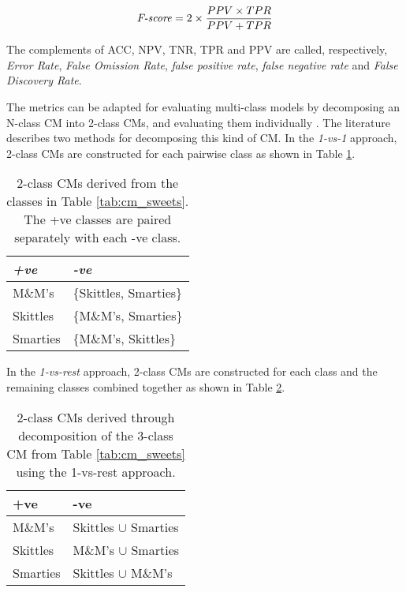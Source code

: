 \begin{equation}
\label{eq:cm_fscore}
\textnormal{\textit{F-score}} = 2 \times \frac{PPV \times TPR}{PPV + TPR}
\end{equation}

The complements of ACC, NPV, TNR, TPR and PPV are called, respectively, \textit{Error Rate}, \textit{False Omission Rate}, \textit{false positive rate}, \textit{false negative rate} and \textit{False Discovery Rate}.

The metrics can be adapted for evaluating multi-class models by decomposing an N-class CM into 2-class CMs, and evaluating them individually \citep{stager2006dealing}. The literature describes two methods for decomposing this kind of  CM. In the \textit{1-vs-1} approach, 2-class CMs are constructed for each pairwise class as shown in Table \ref{tab:cm_1vs1}.

\begin{table}[ht]
  \centering
  \selectfont
  \begin{tabular}{ll}
    \toprule
    \textit{+ve} & \textit{-ve} \\
    \midrule
    M\&M's       & $\{$Skittles, Smarties$\}$ \\
    Skittles     & $\{$M\&M's, Smarties$\}$ \\
    Smarties     & $\{$M\&M's, Skittles$\}$ \\
    \bottomrule
  \end{tabular}
  \caption{2-class CMs derived from the classes in Table \ref{tab:cm_sweets}. The +ve classes are paired separately with each -ve class.}
  \label{tab:cm_1vs1}
\end{table}
\vspace{2mm}

In the \textit{1-vs-rest} approach, 2-class CMs are constructed for each class and the remaining classes combined together as shown in Table \ref{tab:cm_1vsN}.

\begin{table}[ht]
  \centering
  \selectfont
  \begin{tabular}{ll}
    \toprule
    +ve       & -ve \\
    \midrule
    M\&M's    & Skittles $\cup$ Smarties \\
    Skittles  & M\&M's $\cup$ Smarties \\
    Smarties  & Skittles $\cup$ M\&M's \\
    \bottomrule
  \end{tabular}
  \caption{2-class CMs derived through decomposition of the 3-class CM from Table \ref{tab:cm_sweets} using the 1-vs-rest approach.}
  \label{tab:cm_1vsN}
\end{table}
\vspace{2mm}

